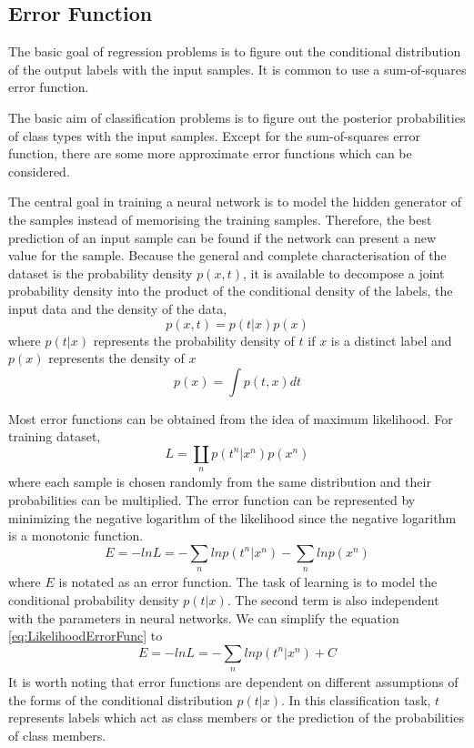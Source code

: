 \subsection{Error Function}

The basic goal of regression problems is to figure out the conditional distribution of the output labels with the input samples. It is common to use a sum-of-squares error function.

The basic aim of classification problems is to figure out the posterior probabilities of class types with the input samples. Except for the sum-of-squares error function, there are some more approximate error functions which can be considered.

The central goal in training a neural network is to model the hidden generator of the samples instead of memorising the training samples. Therefore, the best prediction of an input sample can be found if the network can present a new value for the sample. Because the general and complete characterisation of the dataset is the probability density $p(x,t)$, it is available to decompose a joint probability density into the product of the conditional density of the labels, the input data and the density of the data,
\begin{equation}\label{eq:JointProbDensity}
p(x,t) = p(t|x)p(x)
\end{equation}
where $p(t|x)$ represents the probability density of $t$ if $x$ is a distinct label and $p(x)$ represents the density of $x$
\begin{equation}\label{eq:ProbDensityX}
p(x) = \int p(t,x)dt
\end{equation}

Most error functions can be obtained from the idea of maximum likelihood. For training dataset, 
\begin{equation}\label{eq:LikelihoodLoss}
L = \coprod_{\substack{n}}  p(t^n|x^n)p(x^n)
\end{equation}
where each sample is chosen randomly from the same  distribution and their probabilities can be multiplied. The error function can be represented by minimizing the negative logarithm of the likelihood since the negative logarithm is a monotonic function.
\begin{equation}\label{eq:LikelihoodErrorFunc}
E = -ln L = -\sum_{\substack{n}} ln p(t^n|x^n) - \sum_{\substack{n}}lnp(x^n)
\end{equation}
where $E$ is notated as an error function. The task of learning is to model the conditional probability density $p(t|x)$. The second term is also independent with the parameters in neural networks.  We can simplify the equation \ref{eq:LikelihoodErrorFunc} to
\begin{equation}\label{eq:SimLikelihoodErrorFunc}
E = -ln L = -\sum_{\substack{n}} ln p(t^n|x^n) + C
\end{equation}
It is worth noting that error functions are dependent on different assumptions of the forms of the conditional distribution $p(t|x)$. In this classification task, $t$ represents labels which act as class members or the prediction of the probabilities of class members.

